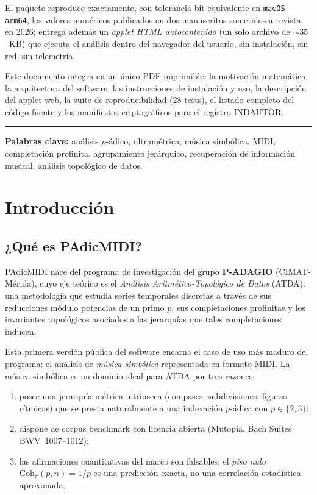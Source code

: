 \documentclass[11pt,a4paper,oneside]{article}
\theoremstyle{plain}
\theoremstyle{definition}
\theoremstyle{remark}
\newcommand{\Cohpi}{\mathrm{Coh}_\pi}
\newcommand{\code}[1]{\texttt{\small #1}}
\begin{document}
El paquete reproduce exactamente, con tolerancia bit-equivalente en
\code{macOS arm64}, los valores numéricos publicados en dos manuscritos
sometidos a revista en 2026; entrega además un \emph{applet HTML
autocontenido} (un solo archivo de \(\sim 35\)~KB) que ejecuta el
análisis dentro del navegador del usuario, sin instalación, sin red, sin
telemetría.

Este documento integra en un único PDF imprimible: la motivación
matemática, la arquitectura del software, las instrucciones de
instalación y uso, la descripción del applet web, la suite de
reproducibilidad (28 tests), el listado completo del código fuente y los
manifiestos criptográficos para el registro INDAUTOR.

\vspace{1em}
\hrule
\vspace{0.8em}
{\small \textbf{Palabras clave:} análisis $p$-ádico, ultramétrica,
música simbólica, MIDI, completación profinita, agrupamiento jerárquico,
recuperación de información musical, análisis topológico de datos.}

\vspace{2em}
\tableofcontents
\newpage

\section{Introducción}\label{sec:intro}

\subsection{¿Qué es PAdicMIDI?}

PAdicMIDI nace del programa de investigación del grupo \textbf{P-ADAGIO}
(CIMAT-Mérida), cuyo eje teórico es el \emph{Análisis
Aritmético-Topológico de Datos} (ATDA): una metodología que estudia
series temporales discretas a través de sus reducciones módulo potencias
de un primo $p$, sus completaciones profinitas y los invariantes
topológicos asociados a las jerarquías que tales completaciones inducen.

Esta primera versión pública del software encarna el caso de uso más
maduro del programa: el análisis de \emph{música simbólica} representada
en formato MIDI. La música simbólica es un dominio ideal para ATDA por
tres razones:

\begin{enumerate}[itemsep=2pt]
  \item posee una jerarquía métrica intrínseca (compases, subdivisiones,
        figuras rítmicas) que se presta naturalmente a una indexación
        $p$-ádica con $p \in \{2, 3\}$;
  \item dispone de corpus benchmark con licencia abierta
        (Mutopia, Bach Suites BWV~1007--1012);
  \item las afirmaciones cuantitativas del marco son falsables: el
        \emph{piso nulo} $\Cohpi(p,n) = 1/p$ es una predicción exacta,
        no una correlación estadística aproximada.
\end{enumerate}
\end{document}
